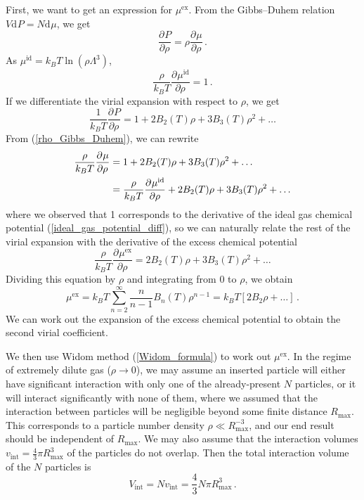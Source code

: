 \documentclass{article}
\theoremstyle{plain}\theoremheaderfont{\normalfont\bfseries}\theorembodyfont{\rmfamily}\theoremseparator{.}\newtheorem*{thm}{Theorem}\newtheorem*{law}{Law}\newtheorem*{pos}{Postulate}
\numberwithin{equation}{section}
\renewcommand{\d}[2][]{\mathrm{d}^{#1} #2}
\newcommand{\pdv}[3][]{\frac{\partial^{#1} #2}{{\partial #3}^{#1}}}
\begin{document}
    First, we want to get an expression for \(\mu^{\text{ex}}\). From the Gibbs--Duhem relation \(V\d{P}=N\d{\mu}\), we get
    \begin{equation}\label{rho_Gibbs_Duhem}
        \pdv{P}{\rho}=\rho\pdv{\mu}{\rho}\,.
    \end{equation}
    As \(\mu^{\text{id}}=k_B T\ln(\rho\Lambda^3)\),
    \begin{equation}\label{ideal_gas_potential_diff}
        \frac{\rho}{k_B T}\pdv{\mu^{\text{id}}}{\rho}=1\,.
    \end{equation}
    If we differentiate the virial expansion with respect to \(\rho\), we get
    \begin{equation}
        \frac{1}{k_B T}\pdv{P}{\rho}=1+2B_2(T)\rho+3B_3(T)\rho^2+\dots
    \end{equation}
    From (\ref{rho_Gibbs_Duhem}), we can rewrite
    \begin{align}
        \frac{\rho}{k_B T}\pdv{\mu}{\rho}&=1+2B_2(T)\rho+3B_3(T)\rho^2+\dots\notag\\
        &=\frac{\rho}{k_B T}\pdv{\mu^{\text{id}}}{\rho}+2B_2(T)\rho+3B_3(T)\rho^2+\dots
    \end{align}
    where we observed that 1 corresponds to the derivative of the ideal gas chemical potential (\ref{ideal_gas_potential_diff}), so we can naturally relate the rest of the virial expansion with the derivative of the excess chemical potential
    \begin{equation}
        \frac{\rho}{k_B T}\pdv{\mu^{\text{ex}}}{\rho}=2B_2(T)\rho+3B_3(T)\rho^2+\dots
    \end{equation}
    Dividing this equation by \(\rho\) and integrating from 0 to \(\rho\), we obtain
    \begin{equation}
        \mu^{\text{ex}}=k_B T\sum_{n=2}^{\infty}\frac{n}{n-1}B_n(T)\rho^{n-1}=k_B T[2B_2\rho+\dots]\,.
    \end{equation}
    We can work out the expansion of the excess chemical potential to obtain the second virial coefficient.

    We then use Widom method (\ref{Widom_formula}) to work out \(\mu^{\text{ex}}\). In the regime of extremely dilute gas (\(\rho\to 0\)), we may assume an inserted particle will either have significant interaction with only one of the already-present \(N\) particles, or it will interact significantly with none of them, where we assumed that the interaction between particles will be negligible beyond some finite distance \(R_{\text{max}}\). This corresponds to a particle number density \(\rho\ll R_{\text{max}}^{-3}\), and our end result should be independent of \(R_{\text{max}}\). We may also assume that the interaction volumes \(v_{\text{int}}=\frac{4}{3}\pi R_{\text{max}}^3\) of the particles do not overlap. Then the total interaction volume of the \(N\) particles is
    \begin{equation}
        V_{\text{int}}=Nv_{\text{int}}=\frac{4}{3}N\pi R_{\text{max}}^3\,.
    \end{equation}
\end{document}
